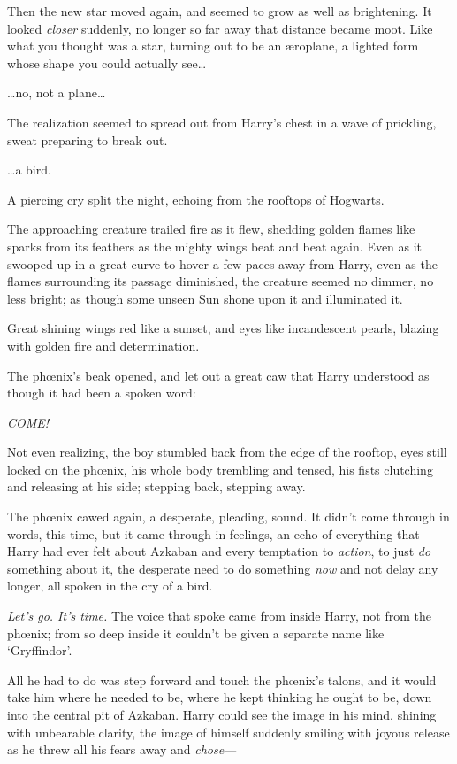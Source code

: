 Then the new star moved again, and seemed to grow as well as brightening. It looked \emph{closer} suddenly, no longer so far away that distance became moot. Like what you thought was a star, turning out to be an æroplane, a lighted form whose shape you could actually see{\ldots}

{\ldots}no, not a plane{\ldots}

The realization seemed to spread out from Harry's chest in a wave of prickling, sweat preparing to break out.

{\ldots}a bird.

A piercing cry split the night, echoing from the rooftops of Hogwarts.

The approaching creature trailed fire as it flew, shedding golden flames like sparks from its feathers as the mighty wings beat and beat again. Even as it swooped up in a great curve to hover a few paces away from Harry, even as the flames surrounding its passage diminished, the creature seemed no dimmer, no less bright; as though some unseen Sun shone upon it and illuminated it.

Great shining wings red like a sunset, and eyes like incandescent pearls, blazing with golden fire and determination.

The phœnix's beak opened, and let out a great caw that Harry understood as though it had been a spoken word:

\emph{COME!}

Not even realizing, the boy stumbled back from the edge of the rooftop, eyes still locked on the phœnix, his whole body trembling and tensed, his fists clutching and releasing at his side; stepping back, stepping away.

The phœnix cawed again, a desperate, pleading, sound. It didn't come through in words, this time, but it came through in feelings, an echo of everything that Harry had ever felt about Azkaban and every temptation to \emph{action}, to just \emph{do} something about it, the desperate need to do something \emph{now} and not delay any longer, all spoken in the cry of a bird.

\emph{Let's go. It's time.} The voice that spoke came from inside Harry, not from the phœnix; from so deep inside it couldn't be given a separate name like `Gryffindor'.

All he had to do was step forward and touch the phœnix's talons, and it would take him where he needed to be, where he kept thinking he ought to be, down into the central pit of Azkaban. Harry could see the image in his mind, shining with unbearable clarity, the image of himself suddenly smiling with joyous release as he threw all his fears away and \emph{chose}—

